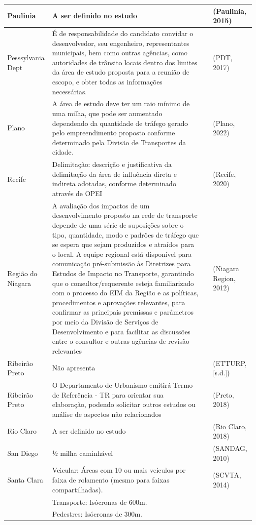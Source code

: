 \documentclass[]{article}
\begin{document}
\begin{table}
\begin{tabular}[t]{l|l|l|l}
\hline
Paulinia & A ser definido no estudo &  & (Paulinia, 2015)\\
\hline
Pesssylvania Dept & É de responsabilidade do candidato convidar o desenvolvedor, seu engenheiro, representantes municipais, bem como outras agências, como autoridades de trânsito locais dentro dos limites da área de estudo proposta para a reunião de escopo, e obter todas as informações necessárias. &  & (PDT, 2017)\\
\hline
Plano & A área de estudo deve ter um raio mínimo de uma milha, que pode ser aumentado dependendo da quantidade de tráfego gerado pelo empreendimento proposto conforme determinado pela Divisão de Transportes da cidade. &  & (Plano, 2022)\\
\hline
Recife & Delimitação: descrição e justificativa da delimitação da área de influência direta e indireta adotadas, conforme determinado através de OPEI &  & (Recife, 2020)\\
\hline
Região do Niagara & A avaliação dos impactos de um desenvolvimento proposto na rede de transporte depende de uma série de suposições sobre o tipo, quantidade, modo e padrões de tráfego que se espera que sejam produzidos e atraídos para o local. A equipe regional está disponível para comunicação pré-submissão às Diretrizes para Estudos de Impacto no Transporte, garantindo que o consultor/requerente esteja familiarizado com o processo do EIM da Região e as políticas, procedimentos e aprovações relevantes, para confirmar as principais premissas e parâmetros por meio da Divisão de Serviços de Desenvolvimento e para facilitar as discussões entre o consultor e outras agências de revisão relevantes &  & (Niagara Region, 2012)\\
\hline
Ribeirão Preto & Não apresenta &  & (ETTURP, [s.d.])\\
\hline
Ribeirão Preto & O Departamento de Urbanismo emitirá Termo de Referência - TR para orientar sua elaboração, podendo solicitar outros estudos ou análise de aspectos não relacionados &  & (Preto, 2018)\\
\hline
Rio Claro & A ser definido no estudo &  & (Rio Claro, 2018)\\
\hline
San Diego & ½ milha caminhável &  & (SANDAG, 2010)\\
\hline
Santa Clara & Veicular: Áreas com 10 ou mais veículos por faixa de rolamento (mesmo para faixas compartilhadas). &  & (SCVTA, 2014)\\
\hline
 & Transporte: Isócronas de 600m. &  & \\
\hline
 & Pedestres: Isócronas de 300m. &  & \\

\end{tabular}
\end{table}
\end{document}
